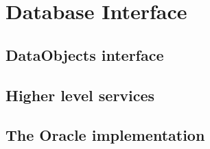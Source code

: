 %
%
%
%
%

\chapter{Database Interface}

\section{DataObjects interface}

\section{Higher level services}

\section{The Oracle implementation}
